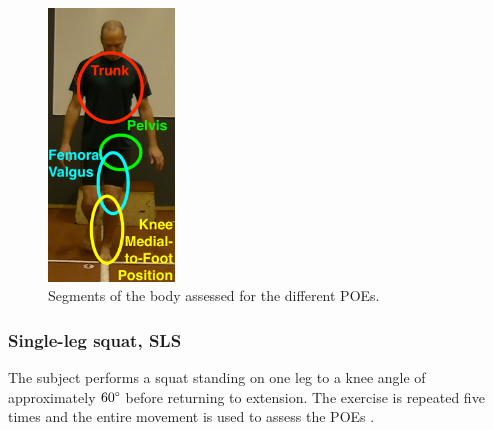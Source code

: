 \begin{figure}
  \centering
  \includegraphics[width=0.3\textwidth]{files/figs/presentation/poe-segments.png}
  \caption{Segments of the body assessed for the different POEs.}
  \label{fig:poe-segments}
\end{figure}

\subsubsection{Single-leg squat, SLS} \label{sec:SLS}
The subject performs a squat standing on one leg to a knee angle of approximately $60\degree$ before returning to extension. The exercise is repeated five times and the entire movement is used to assess the POEs \cite{Nae2020}. %

